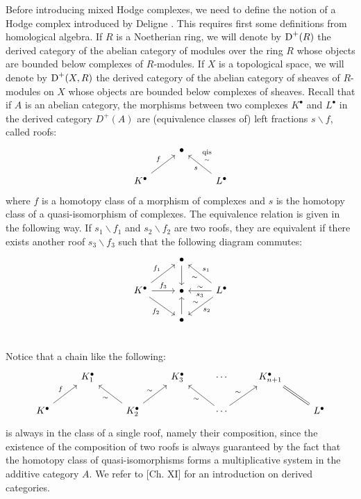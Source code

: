 \documentclass[../main.tex]{subfiles}
\begin{document}
Before introducing mixed Hodge complexes, we need to define the notion of a Hodge complex introduced by Deligne \cite{Del74}.
This requires first some definitions from homological algebra.
If $R$ is a Noetherian ring, we will denote by $\operatorname{D}^+(R)$ the derived category of the abelian category of modules over the ring $R$ whose objects are bounded below complexes of $R$-modules. If $X$ is a topological space, we will denote by $\operatorname{D}^+(X,R)$ the derived category of the abelian category of sheaves of $R$-modules on $X$ whose objects are bounded below complexes of sheaves.
Recall that if $A$ is an abelian category, the morphisms between two complexes $K^\bullet$ and $L^\bullet$ in the derived category $D^+(A)$ are (equivalence classes of) left fractions $s\backslash f$, called roofs:
\[
\begin{tikzcd}
    & \bullet  &   \\
  K^\bullet \arrow{ru}{f} &  &  L^\bullet \arrow{lu}{s}[swap]{\underset{\sim}{\qis}} 
\end{tikzcd}
\]
where $f$ is a homotopy class of a morphism of complexes and $s$ is the homotopy class of a quasi-isomorphism of complexes. The equivalence relation is given in the following way. If $s_1\backslash f_1$ and  $s_2\backslash f_2$ are two roofs, they are equivalent if there exists another roof $s_3\backslash f_3$ such that the following diagram commutes:
\[
\begin{tikzcd}
     & \bullet \arrow{d}  &   \\
     K^\bullet \arrow{ru}{f_1} \arrow{rd}[swap]{f_2} \arrow{r}{f_3} & \bullet  & L^\bullet \arrow{lu}{\sim}[swap]{{s_1}}  \arrow{l}{s_3}[swap]{{\sim}{}}   \arrow{ld}{s_2}[swap]{{\sim}}  \\
      & \bullet \arrow{u} &   \\
\end{tikzcd}
\]
Notice that a chain like the following:
\begin{equation} \label{pseudomor}
\begin{tikzcd} 
    & K_1^\bullet  &  & K_3^\bullet & \cdots & K_{n+1}^\bullet & \\
  K^\bullet \arrow{ru}{f} &  & K_2^\bullet \arrow{lu}{\sim} \arrow{ru}{\sim} &  &  \cdots \arrow{ru}{\sim} \arrow{lu}{\sim} &  & L^\bullet 
 \ar[equal]{lu} 
\end{tikzcd}
\end{equation}
is always in the class of a single roof, namely their composition, since the existence of the composition of two roofs is always guaranteed by the fact that the homotopy class of quasi-isomorphisms forms a multiplicative system in the additive category $A$. We refer to \cite{Iver86}[Ch. XI] for an introduction on derived categories.
\end{document}
